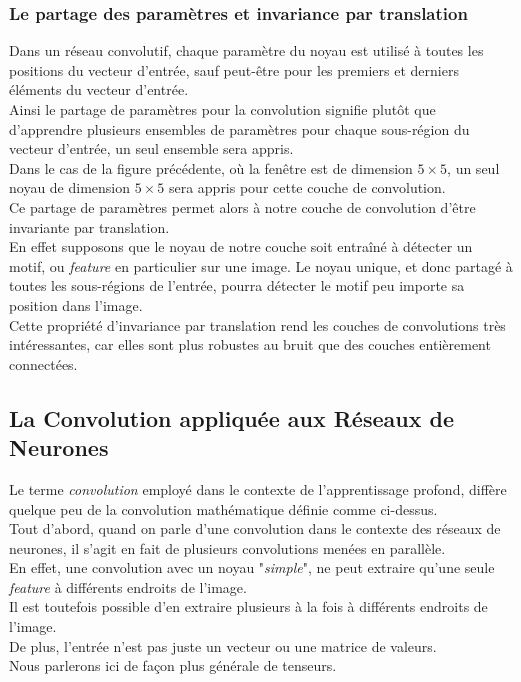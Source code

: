 \documentclass[10pt,a4paper]{report}
\begin{document}
			\subsubsection{Le partage des paramètres et invariance par translation}
			Dans un réseau convolutif, chaque paramètre du noyau est utilisé à toutes les positions du vecteur d'entrée, sauf peut-être pour les premiers et derniers éléments du vecteur d'entrée.\\
			Ainsi le partage de paramètres pour la convolution signifie plutôt que d'apprendre plusieurs ensembles de paramètres pour chaque sous-région du vecteur d'entrée, un seul ensemble sera appris.\\
			Dans le cas de la figure précédente, où la fenêtre est de dimension $5 \times 5$, un seul noyau de dimension $5 \times 5$ sera appris pour cette couche de convolution.\\
			Ce partage de paramètres permet alors à notre couche de convolution d'être invariante par translation.\\
			En effet supposons que le noyau de notre couche soit entraîné à détecter un motif, ou \emph{feature} en particulier sur une image. Le noyau unique, et donc partagé à toutes les sous-régions de l'entrée, pourra détecter le motif peu importe sa position dans l'image.\\
			
			Cette propriété d'invariance par translation rend les couches de convolutions très intéressantes, car elles sont plus robustes au bruit que des couches entièrement connectées.
				
			\subsection{La Convolution appliquée aux Réseaux de Neurones}
			Le terme \emph{convolution} employé dans le contexte de l'apprentissage profond, diffère quelque peu de la convolution mathématique définie comme ci-dessus.\\
			Tout d'abord, quand on parle d'une convolution dans le contexte des réseaux de neurones, il s'agit en fait de plusieurs convolutions menées en parallèle.\\
			En effet, une convolution avec un noyau "\emph{simple}", ne peut extraire qu'une seule \emph{feature} à différents endroits de l'image.\\
			Il est toutefois possible d'en extraire plusieurs à la fois à différents endroits de l'image.\\
			De plus, l'entrée n'est pas juste un vecteur ou une matrice de valeurs.\\
			Nous parlerons ici de façon plus générale de tenseurs.
\end{document}
